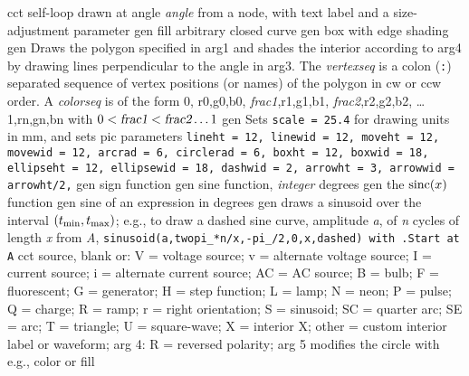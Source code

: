   {cct}
  {self-loop drawn at angle {\sl angle} from a node,
     with text label and a size-adjustment parameter }
  {gen}
  {fill arbitrary closed curve}
  {gen}
  {box with edge shading}
  {gen}
  {Draws the polygon specified in arg1 and shades the interior according
   to arg4 by drawing lines perpendicular to the angle in arg3.
   The {\sl vertexseq} is a colon ({\tt:}) separated sequence of vertex
   positions (or names) of the polygon in cw or ccw order. A {\sl colorseq}
   is of the form 0, r0,g0,b0, {\sl frac1},r1,g1,b1, {\sl frac2},r2,g2,b2,
   \ldots 1,rn,gn,bn with $0 < \hbox{\sl frac1} < \hbox{\sl frac2} \ldots 1$
}
  {gen}
  {Sets {\tt scale = 25.4} for drawing units in mm, and sets
   pic parameters {\tt lineht = 12, linewid = 12, moveht = 12, movewid = 12,
    arcrad = 6, circlerad = 6, boxht = 12, boxwid = 18, ellipseht = 12,
    ellipsewid = 18, dashwid = 2, arrowht = 3, arrowwid = arrowht/2,}}
  {gen}
  {sign function}
  {gen}
  {sine function, {\sl integer\/} degrees}
  {gen}
  {the $\hbox{sinc}(x)$ function}
  {gen}
  {sine of an expression in degrees}
  {gen}
  {draws a sinusoid over the interval
  $(t_{\hbox{\scriptsize min}}, t_{\hbox{\scriptsize max}})$;
   e.g., to draw a dashed sine curve, amplitude {\sl a}, of {\sl n} cycles
   of length {\sl x} from {\sl A},
   {\tt sinusoid(a,twopi\_*n/x,-pi\_/2,0,x,dashed) with .Start at A}}
\macrodef{source}{source}{(\linespec,
   V|v|I|i|AC|B|F|G|H|J|Q|L|N|P|S[C[r]]|E[r]]|T|X|U|{\sl other},
   {\sl diameter},R)}
  {cct}
  {source, blank or:
                     V = voltage source; v = alternate voltage source;
                     I = current source; i = alternate current source;
                     AC = AC source; B = bulb; F = fluorescent; G =
                     generator; H = step function; L = lamp;
                     N = neon; P = pulse; Q = charge; R = ramp; r = right
                     orientation; S = sinusoid; SC = quarter arc; SE =
                     arc; T = triangle; U = square-wave; X = interior X;
                     other = custom interior label or waveform;
                     arg 4: R = reversed polarity;
                     arg 5 modifies the circle with e.g., color or fill
   }
